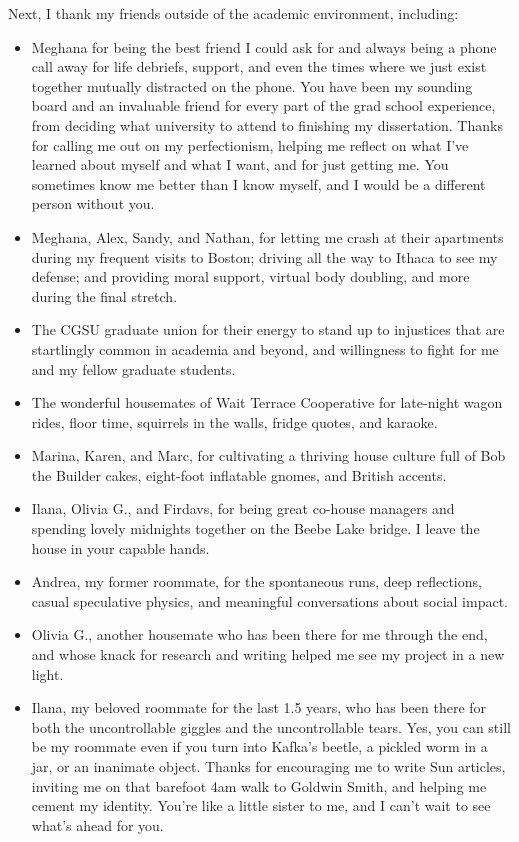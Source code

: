 Next, I thank my friends outside of the academic environment, including:
\begin{itemize}
  \item Meghana for being the best friend I could ask for and always being a phone call away 
  for life debriefs, support, and even the times where 
  we just exist together mutually distracted on the phone.
  You have been my sounding board and an invaluable friend for
  every part of the grad school experience,
  from deciding what university to attend to finishing my dissertation.
  Thanks for calling me out on my perfectionism, 
  helping me reflect on what I've learned about myself and what I want, 
  and for just getting me.
  You sometimes know me better than I know myself, 
  and I would be a different person without you.
  \item Meghana, Alex, Sandy, and Nathan, for letting me crash at their apartments
  during my frequent visits to Boston; driving all the way to Ithaca to see my defense;
  and providing moral support, virtual body doubling, and more during the final stretch.
  \item The CGSU graduate union for their energy to stand up to injustices 
  that are startlingly common in academia and beyond,
  and willingness to fight for me and my fellow graduate students.
  \item The wonderful housemates of Wait Terrace Cooperative 
  for late-night wagon rides, floor time, squirrels in the walls, fridge quotes, and karaoke.
  \item Marina, Karen, and Marc, for cultivating a thriving house culture 
  full of Bob the Builder cakes, eight-foot inflatable gnomes, and British accents.
  \item Ilana, Olivia G., and Firdavs, for being great co-house managers 
  and spending lovely midnights together on the Beebe Lake bridge. 
  I leave the house in your capable hands.
  \item Andrea, my former roommate, for the spontaneous runs, deep reflections, casual speculative physics, and meaningful conversations about social impact.
  \item Olivia G., another housemate who has been there for me through the end,
  and whose knack for research and writing helped me see my project in a new light.
  \item Ilana, my beloved roommate for the last 1.5 years, 
  who has been there for both the uncontrollable giggles and the uncontrollable tears.
  Yes, you can still be my roommate even if you turn into Kafka's beetle, 
  a pickled worm in a jar, or an inanimate object.
  Thanks for encouraging me to write Sun articles, 
  inviting me on that barefoot 4am walk to Goldwin Smith, 
  and helping me cement my identity.
  You're like a little sister to me, and I can't wait to see what's ahead for you.
\end{itemize}

